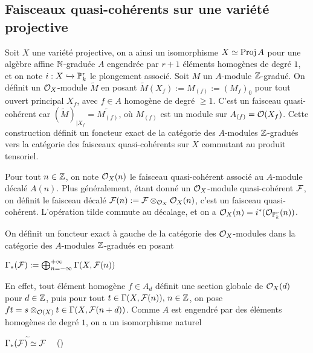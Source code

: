 \subsection{Faisceaux quasi-cohérents sur une variété projective}

\label{FQCProj}

Soit $X$ une variété projective, on a ainsi un isomorphisme $X\simeq\operatorname{Proj} A$ pour une algèbre affine $\mathbb{N}$-graduée $A$ engendrée par $r+1$ éléments homogènes de degré $1$, et on note $i:X\xhookrightarrow{} \mathbb{P}_k^r$ le plongement associé. Soit $M$ un $A$-module $\mathbb{Z}$-gradué. On définit un $\mathcal{O}_X$-module $\widetilde{M}$ en posant $\widetilde{M}(X_f):=M_{(f)}:=(M_f)_0$ pour tout ouvert principal $X_f$, avec $f\in A$ homogène de degré $\geq 1$. C'est un faisceau quasi-cohérent car $(\widetilde{M})_{|X_f}=\widetilde{M_{(f)}}$, où $M_{(f)}$ est un module sur $A_{(f)}=\mathcal{O}(X_f)$. Cette construction définit un foncteur exact de la catégorie des $A$-modules $\mathbb{Z}$-gradués vers la catégorie des faisceaux quasi-cohérents sur $X$ commutant au produit tensoriel.

Pour tout $n\in \mathbb{Z}$, on note $\mathcal{O}_X(n)$ le faisceau quasi-cohérent associé au $A$-module décalé $A(n)$. Plus généralement, étant donné un $\mathcal{O}_X$-module quasi-cohérent $\mathcal{F}$, on définit le faisceau décalé $\mathcal{F}(n):=\mathcal{F}\otimes_{\mathcal{O}_X}\mathcal{O}_X(n)$, c'est un faisceau quasi-cohérent. L'opération tilde commute au décalage, et on a $\mathcal{O}_X(n)=i^*(\mathcal{O}_{\mathbb{P}_k^r}(n))$.

On définit un foncteur exact à gauche de la catégorie des $\mathcal{O}_X$-modules dans la catégorie des $A$-modules $\mathbb{Z}$-gradués en posant 
\begin{center}
$\Gamma_*(\mathcal{F}):=\bigoplus_{n=-\infty}^{+\infty}\Gamma(X,\mathcal{F}(n))$
\end{center}
En effet, tout élément homogène $f\in A_d$ définit une section globale de $\mathcal{O}_X(d)$ pour $d\in \mathbb{Z}$, puis pour tout $t\in \Gamma(X,\mathcal{F}(n)),\, n\in\mathbb{Z}$, on pose $ft=s\otimes_{\mathcal{O}(X)} t\in \Gamma(X, \mathcal{F}(n+d))$. Comme $A$ est engendré par des éléments homogènes de degré $1$, on a un isomorphisme naturel 
\begin{center}
$\Gamma_*(\mathcal{F})^{\widetilde{}}\simeq \mathcal{F}\,\,\,\,\,$ (\cite[II.5.15]{Hartshorne})\end{center}

